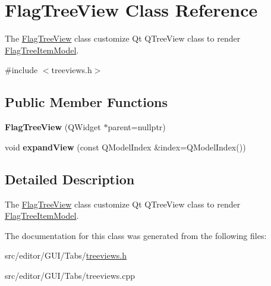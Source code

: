 \hypertarget{class_flag_tree_view}{\section{\-Flag\-Tree\-View \-Class \-Reference}
\label{class_flag_tree_view}
}


\-The \hyperlink{class_flag_tree_view}{\-Flag\-Tree\-View} class customize \-Qt \-Q\-Tree\-View class to render \hyperlink{class_flag_tree_item_model}{\-Flag\-Tree\-Item\-Model}.  




{\ttfamily \#include $<$treeviews.\-h$>$}

\subsection*{\-Public \-Member \-Functions}
\begin{DoxyCompactItemize}
\item 
\hypertarget{class_flag_tree_view_a86985ac668579405a7f48cb907f1f531}{{\bfseries \-Flag\-Tree\-View} (\-Q\-Widget $\ast$parent=nullptr)}\label{class_flag_tree_view_a86985ac668579405a7f48cb907f1f531}

\item 
\hypertarget{class_flag_tree_view_a9e83c94c3b971d01275c747ad30003ee}{void {\bfseries expand\-View} (const \-Q\-Model\-Index \&index=\-Q\-Model\-Index())}\label{class_flag_tree_view_a9e83c94c3b971d01275c747ad30003ee}

\end{DoxyCompactItemize}


\subsection{\-Detailed \-Description}
\-The \hyperlink{class_flag_tree_view}{\-Flag\-Tree\-View} class customize \-Qt \-Q\-Tree\-View class to render \hyperlink{class_flag_tree_item_model}{\-Flag\-Tree\-Item\-Model}. 

\-The documentation for this class was generated from the following files\-:\begin{DoxyCompactItemize}
\item 
src/editor/\-G\-U\-I/\-Tabs/\hyperlink{treeviews_8h}{treeviews.\-h}\item 
src/editor/\-G\-U\-I/\-Tabs/treeviews.\-cpp\end{DoxyCompactItemize}
